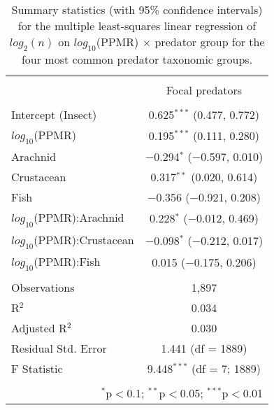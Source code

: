 
\begin{table}[!htbp] \centering 
  \caption{Summary statistics (with 95\% confidence intervals) for the multiple least-squares linear regression of $log_2(n)$ on $log_{10}$(PPMR) $\times$ predator group for the four most common predator taxonomic groups.} 
  \label{tab:n-ppmr_byPred} 
\begin{tabular}{@{\extracolsep{5pt}}lc} 
\\[-1.8ex]\hline 
\hline \\[-1.8ex] 
 & \multicolumn{1}{c}{Focal predators} \\ 
\cline{2-2} 
\hline \\[-1.8ex] 
 Intercept (Insect) & 0.625$^{***}$ (0.477, 0.772) \\ 
  $log_{10}$(PPMR) & 0.195$^{***}$ (0.111, 0.280) \\ 
  Arachnid & $-$0.294$^{*}$ ($-$0.597, 0.010) \\ 
  Crustacean & 0.317$^{**}$ (0.020, 0.614) \\ 
  Fish & $-$0.356 ($-$0.921, 0.208) \\ 
  $log_{10}$(PPMR):Arachnid & 0.228$^{*}$ ($-$0.012, 0.469) \\ 
  $log_{10}$(PPMR):Crustacean & $-$0.098$^{*}$ ($-$0.212, 0.017) \\ 
  $log_{10}$(PPMR):Fish & 0.015 ($-$0.175, 0.206) \\ 
 \hline \\[-1.8ex] 
Observations & 1,897 \\ 
R$^{2}$ & 0.034 \\ 
Adjusted R$^{2}$ & 0.030 \\ 
Residual Std. Error & 1.441 (df = 1889) \\ 
F Statistic & 9.448$^{***}$ (df = 7; 1889) \\ 
\hline 
\hline \\[-1.8ex] 
\multicolumn{2}{r}{$^{*}$p$<$0.1; $^{**}$p$<$0.05; $^{***}$p$<$0.01} \\ 
\end{tabular} 
\end{table} 
